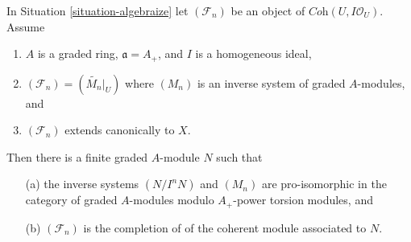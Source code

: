 \begin{lemma}
\label{lemma-Gm-equivariant-extend-canonically}
In Situation \ref{situation-algebraize} let $(\mathcal{F}_n)$ be an
object of $\textit{Coh}(U, I\mathcal{O}_U)$. Assume
\begin{enumerate}
\item $A$ is a graded ring, $\mathfrak a = A_+$, and
$I$ is a homogeneous ideal,
\item $(\mathcal{F}_n) = (\widetilde{M_n}|_U)$ where $(M_n)$
is an inverse system of graded $A$-modules, and
\item $(\mathcal{F}_n)$ extends canonically to $X$.
\end{enumerate}
Then there is a finite graded $A$-module $N$ such that
\begin{enumerate}
\item[(a)] the inverse systems $(N/I^nN)$ and $(M_n)$ are pro-isomorphic
in the category of graded $A$-modules modulo $A_+$-power torsion
modules, and
\item[(b)] $(\mathcal{F}_n)$ is the completion of of the coherent
module associated to $N$.
\end{enumerate}
\end{lemma}

